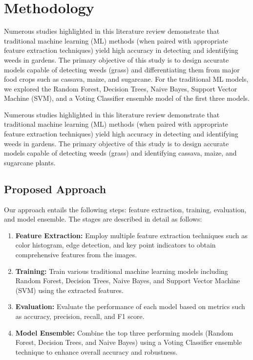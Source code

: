 \documentclass[10pt,twocolumn,letterpaper]{article}
\begin{document}
\section{Methodology}
Numerous studies highlighted in this literature review demonstrate that traditional machine learning (ML) methods (when paired with appropriate feature extraction techniques) yield high accuracy in detecting and identifying weeds in gardens. The primary objective of this study is to design accurate models capable of detecting weeds (grass) and differentiating them from major food crops such as cassava, maize, and sugarcane. For the traditional ML models, we explored the Random Forest, Decision Trees, Naive Bayes, Support Vector Machine (SVM), and a Voting Classifier ensemble model of the first three models.

Numerous studies highlighted in this literature review demonstrate that traditional machine learning (ML) methods (when paired with appropriate feature extraction techniques) yield high accuracy in detecting and identifying weeds in gardens. The primary objective of this study is to design accurate models capable of detecting weeds (grass) and identifying cassava, maize, and sugarcane plants. 

\subsection{Proposed Approach}
Our approach entails the following steps: feature extraction, training, evaluation, and model ensemble. The stages are described in detail as follows:

\begin{enumerate}
    \item \textbf{Feature Extraction:} Employ multiple feature extraction techniques such as color histogram, edge detection, and key point indicators to obtain comprehensive features from the images.
    \item \textbf{Training:} Train various traditional machine learning models including Random Forest, Decision Trees, Naive Bayes, and Support Vector Machine (SVM) using the extracted features.
    \item \textbf{Evaluation:} Evaluate the performance of each model based on metrics such as accuracy, precision, recall, and F1 score.
    \item \textbf{Model Ensemble:} Combine the top three performing models (Random Forest, Decision Trees, and Naive Bayes) using a Voting Classifier ensemble technique to enhance overall accuracy and robustness.
\end{enumerate}
\end{document}
